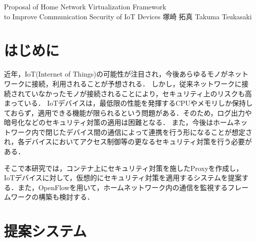 \documentclass[a4paper,10pt,twocolumn,uplatex]{jsarticle}
\date{5}
\begin{document}
{Proposal of Home Network Virtualization Framework\\to Improve Communication Security of IoT Devices}
{塚崎 拓真}
{Takuma Tsukasaki}

\section{はじめに}
近年，IoT(Internet of Things)の可能性が注目され，今後あらゆるモノがネットワークに接続，利用されることが予想される．
しかし，従来ネットワークに接続されていなかったモノが接続されることにより，セキュリティ上のリスクも高まっている\cite{security}．
IoTデバイスは，最低限の性能を発揮するCPUやメモリしか保持しておらず，適用できる機能が限られるという問題がある．そのため，ログ出力や暗号化などのセキュリティ対策の適用は困難となる．
また，今後はホームネットワーク内で閉じたデバイス間の通信によって連携を行う形になることが想定され\cite{d2d}，各デバイスにおいてアクセス制御等の更なるセキュリティ対策を行う必要がある．\par
そこで本研究では，コンテナ上にセキュリティ対策を施したProxyを作成し，IoTデバイスに対して，仮想的にセキュリティ対策を適用するシステムを提案する．また，OpenFlowを用いて，ホームネットワーク内の通信を監視するフレームワークの構築も検討する．


\section{提案システム}
\end{document}

